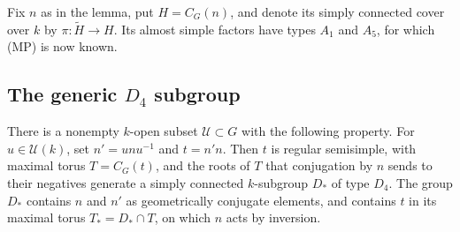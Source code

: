 Fix $n$ as in the lemma, put $H=C_G(n)$, and denote its simply connected
cover over $k$ by $\pi:\widetilde H\to H$.  Its almost simple factors
have types $A_1$ and $A_5$, for which (MP) is now known.

\subsection{The generic \texorpdfstring{$D_4$}{D4} subgroup}

\begin{lemma}\label{lem:e6-generic-d4}
There is a nonempty $k$-open subset $\mathcal U\subset G$ with the
following property.  For $u\in\mathcal U(k)$, set
$n'=unu^{-1}$ and $t=n'n$.  Then $t$ is regular semisimple, with maximal
torus $T=C_G(t)$, and the roots of $T$ that conjugation by $n$ sends to
their negatives generate a simply connected $k$-subgroup $D_*$ of type
$D_4$.  The group $D_*$ contains $n$ and $n'$ as geometrically conjugate
elements, and contains $t$ in its maximal torus $T_*=D_*\cap T$, on
which $n$ acts by inversion.
\end{lemma}

